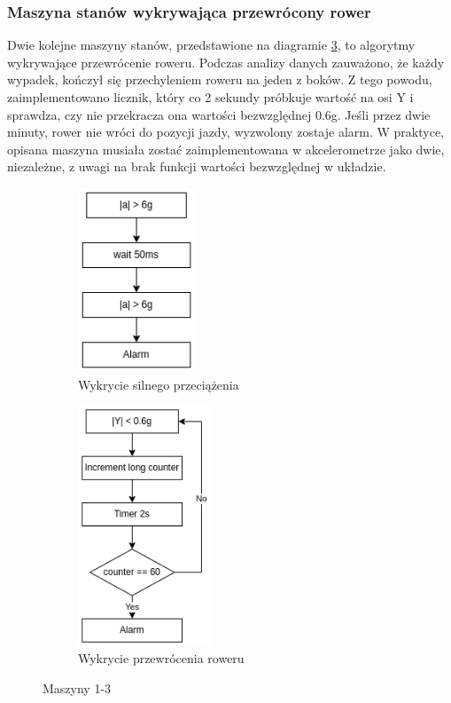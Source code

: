 \subsubsection{Maszyna stanów wykrywająca przewrócony rower}
Dwie kolejne maszyny stanów, przedstawione na diagramie \ref{img:fsm2}, to algorytmy wykrywające przewrócenie roweru. Podczas analizy danych zauważono, że każdy wypadek, kończył się przechyleniem roweru na jeden z boków. Z tego powodu, zaimplementowano licznik, który co 2 sekundy próbkuje wartość na osi Y i sprawdza, czy nie przekracza ona wartości bezwzględnej 0.6g. Jeśli przez dwie minuty, rower nie wróci do pozycji jazdy, wyzwolony zostaje alarm. W praktyce, opisana maszyna musiała zostać zaimplementowana w akcelerometrze jako dwie, niezależne, z uwagi na brak funkcji wartości bezwzględnej w układzie.
\begin{figure}[h]
    \centering
    \begin{subfigure}[b]{5cm}
    \centering
    \includegraphics[width=3.5cm]{Graphics/All_axis_FSM1.png}
    \caption{Wykrycie silnego przeciążenia}
    \label{img:fsm1}
    \end{subfigure}%
    \hspace{1cm}
    \begin{subfigure}[b]{5cm}
    \centering
    \includegraphics[width=4cm]{Graphics/overturned_FSM2_3.png}
    \caption{Wykrycie przewrócenia roweru}
    \label{img:fsm2}
    \end{subfigure}
    \caption{Maszyny 1-3}
\end{figure}
